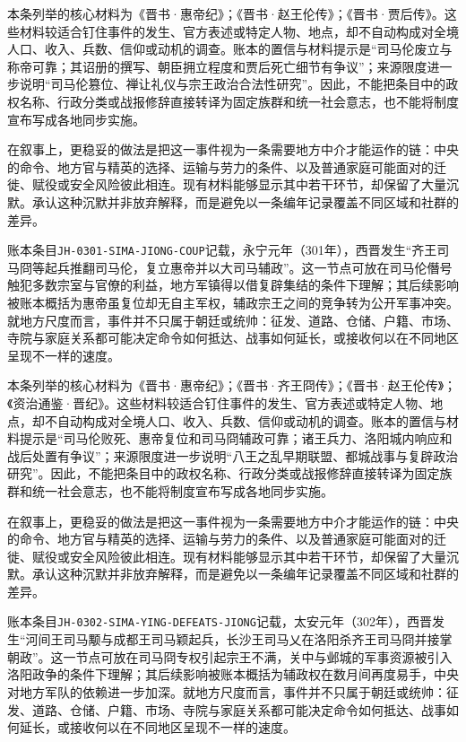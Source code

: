 本条列举的核心材料为《晋书·惠帝纪》；《晋书·赵王伦传》；《晋书·贾后传》。这些材料较适合钉住事件的发生、官方表述或特定人物、地点，却不自动构成对全境人口、收入、兵数、信仰或动机的调查。账本的置信与材料提示是“司马伦废立与称帝可靠；其诏册的撰写、朝臣拥立程度和贾后死亡细节有争议”；来源限度进一步说明“司马伦篡位、禅让礼仪与宗王政治合法性研究”。因此，不能把条目中的政权名称、行政分类或战报修辞直接转译为固定族群和统一社会意志，也不能将制度宣布写成各地同步实施。

在叙事上，更稳妥的做法是把这一事件视为一条需要地方中介才能运作的链：中央的命令、地方官与精英的选择、运输与劳力的条件、以及普通家庭可能面对的迁徙、赋役或安全风险彼此相连。现有材料能够显示其中若干环节，却保留了大量沉默。承认这种沉默并非放弃解释，而是避免以一条编年记录覆盖不同区域和社群的差异。

账本条目\texttt{JH-0301-SIMA-JIONG-COUP}记载，永宁元年（301年），西晋发生“齐王司马冏等起兵推翻司马伦，复立惠帝并以大司马辅政”。这一节点可放在司马伦僭号触犯多数宗室与官僚的利益，地方军镇得以借复辟集结的条件下理解；其后续影响被账本概括为惠帝虽复位却无自主军权，辅政宗王之间的竞争转为公开军事冲突。就地方尺度而言，事件并不只属于朝廷或统帅：征发、道路、仓储、户籍、市场、寺院与家庭关系都可能决定命令如何抵达、战事如何延长，或接收何以在不同地区呈现不一样的速度。

本条列举的核心材料为《晋书·惠帝纪》；《晋书·齐王冏传》；《晋书·赵王伦传》；《资治通鉴·晋纪》。这些材料较适合钉住事件的发生、官方表述或特定人物、地点，却不自动构成对全境人口、收入、兵数、信仰或动机的调查。账本的置信与材料提示是“司马伦败死、惠帝复位和司马冏辅政可靠；诸王兵力、洛阳城内响应和战后处置有争议”；来源限度进一步说明“八王之乱早期联盟、都城战事与复辟政治研究”。因此，不能把条目中的政权名称、行政分类或战报修辞直接转译为固定族群和统一社会意志，也不能将制度宣布写成各地同步实施。

在叙事上，更稳妥的做法是把这一事件视为一条需要地方中介才能运作的链：中央的命令、地方官与精英的选择、运输与劳力的条件、以及普通家庭可能面对的迁徙、赋役或安全风险彼此相连。现有材料能够显示其中若干环节，却保留了大量沉默。承认这种沉默并非放弃解释，而是避免以一条编年记录覆盖不同区域和社群的差异。

账本条目\texttt{JH-0302-SIMA-YING-DEFEATS-JIONG}记载，太安元年（302年），西晋发生“河间王司马颙与成都王司马颖起兵，长沙王司马乂在洛阳杀齐王司马冏并接掌朝政”。这一节点可放在司马冏专权引起宗王不满，关中与邺城的军事资源被引入洛阳政争的条件下理解；其后续影响被账本概括为辅政权在数月间再度易手，中央对地方军队的依赖进一步加深。就地方尺度而言，事件并不只属于朝廷或统帅：征发、道路、仓储、户籍、市场、寺院与家庭关系都可能决定命令如何抵达、战事如何延长，或接收何以在不同地区呈现不一样的速度。

